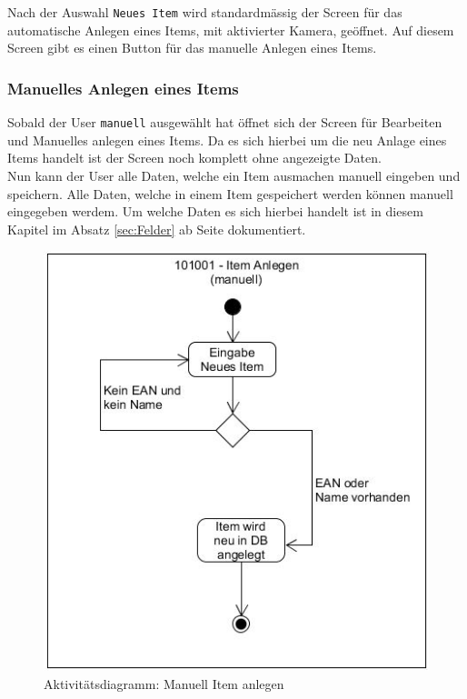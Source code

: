 Nach der Auswahl {\color{IndianRed}\texttt{Neues Item}} wird standardmässig der Screen für das automatische Anlegen eines Items, mit aktivierter Kamera, geöffnet. Auf diesem Screen gibt es einen Button für das manuelle Anlegen eines Items.

\subsubsection{Manuelles Anlegen eines Items}

Sobald der User {\color{IndianRed}\texttt{manuell}} ausgewählt hat öffnet sich der Screen für Bearbeiten und Manuelles anlegen eines Items. Da es sich hierbei um die neu Anlage eines Items handelt ist der Screen noch komplett ohne angezeigte Daten.\\

Nun kann der User alle Daten, welche ein Item ausmachen manuell eingeben und speichern.  Alle Daten, welche in einem Item gespeichert werden können manuell eingegeben werdem. Um welche Daten es sich hierbei handelt ist in diesem Kapitel im Absatz \ref{sec:Felder} ab Seite \pageref{sec:Felder} dokumentiert.

\begin{figure}[htbp]
	\centering
	\includegraphics[scale=0.6]{pic/101001m}
	\caption{Aktivitätsdiagramm: Manuell Item anlegen}
\end{figure}

